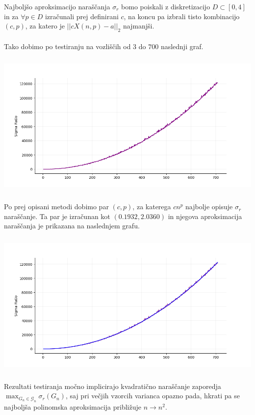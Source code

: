 \documentclass[ letterpaper, titlepage, fleqn]{article}
\begin{document}
Najboljšo aproksimacijo naraščanja $\sigma_r$ bomo poiskali 
z diskretizacijo $D \subset [0, 4]$ in za $\forall p \in D$ 
izračunali prej definirani $c$, na koncu pa izbrali tisto kombinacijo
$(c, p)$, za katero je $||cX(n, p) - a||_{2}$ najmanjši.
\\\\
Tako dobimo po testiranju na vozliščih od $3$ do $700$ naslednji graf.\\
\includegraphics[width=\textwidth, height=8cm]{graphics/sigma_opts.png} \\
Po prej opisani metodi dobimo par $(c, p)$, za katerega $cn^p$ najbolje opisuje
$\sigma_r$ naraščanje. Ta par je izračunan kot $(0.1932, 2.0360)$ in
njegova aproksimacija naraščanja je prikazana na naslednjem grafu.\\
\includegraphics[width=\textwidth, height=8cm]{graphics/sigma_opts_aproximation.png}\\
Rezultati testiranja močno implicirajo kvadratično naraščanje zaporedja 
$\max_{G_n \in \mathscr{G}_n} \sigma_r(G_n)$, saj pri večjih vzorcih varianca opazno pada,
hkrati pa se najboljša polinomska aproksimacija približuje $n \to n^2$.
\pagebreak
\end{document}
